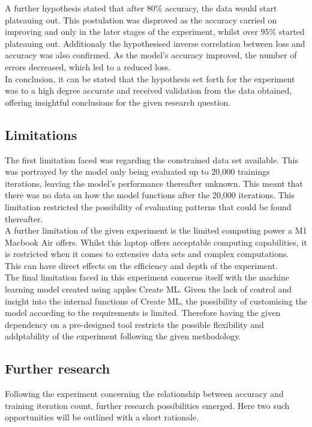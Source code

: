 A further hypothesis stated that after 80\% accuracy, the data would start plateauing out. This postulation was disproved as the accuracy carried on improving and only in the later stages of the experiment, whilst over 95\% started plateauing out.  Additionaly the hypothesised inverse correlation between loss and accuracy was also confirmed. As the model's accuracy improved, the number of errors decreased, which led to a reduced loss.\\ 

In conclusion, it can be stated that the hypothesis set forth for the experiment was to a high degree accurate and received validation from the data obtained, offering insightful conclusions for the given research question. 	\\	

\subsection{Limitations}
The first limitation faced was regarding the constrained data set available. This was portrayed by the model only being evaluated up to 20,000 trainings iterations, leaving the model's performance thereafter unknown. This meant that there was no data on how the model functions after the 20,000 iterations. This limitation restricted the possibility of evaluating patterns that could be found thereafter.\\ 

A further limitation of the given experiment is the limited computing power a M1 Macbook Air offers. Whilst this laptop offers acceptable computing capabilities, it is restricted when it comes to extensive data sets and complex computations. This can have direct effects on the efficiency and depth of the experiment.\\

The final limitation faced in this experiment concerns itself with the machine learning model created using apples Create ML. Given the lack of control and insight into the internal functions of Create ML, the possibility of customising the model according to the requirements is limited. Therefore having the given dependency on a pre-designed tool restricts the possible flexibility and addptability of the experiment following the given methodology. \\

\subsection{Further research}
Following the experiment concerning the relationship between accuracy and training iteration count, further research possibilities emerged. Here two such opportunities will be outlined with a short rationale. \\

